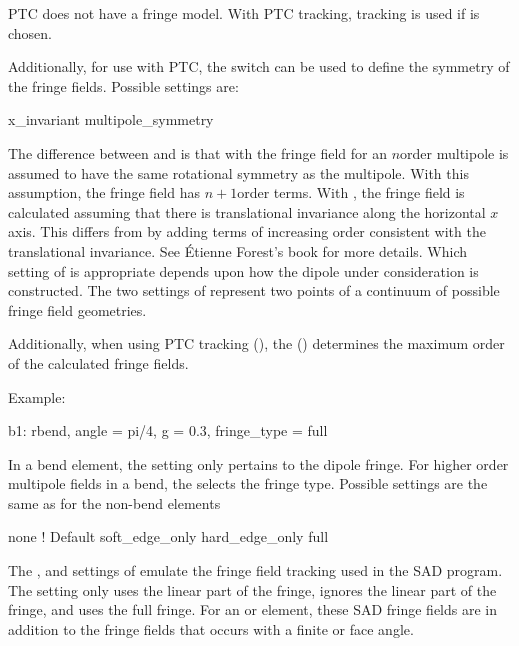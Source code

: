 {PTC does not have a  fringe model.
With PTC tracking,  tracking is used if  is chosen.

Additionally, for use with PTC, the  switch can be used
to define the symmetry of the fringe fields. Possible settings are:
\begin{example}
  x_invariant
  multipole_symmetry
\end{example}
The difference between  and  is that with
 the fringe field for an $n$\Th order multipole is assumed to have the same
rotational symmetry as the multipole. With this assumption, the fringe field has $n+1$\St order
terms.  With , the fringe field is calculated assuming that there is translational
invariance along the horizontal $x$ axis. This differs from  by adding terms
of increasing order consistent with the translational invariance. See \'Etienne Forest's
book\cite{b:forest} for more details. Which setting of  is appropriate
depends upon how the dipole under consideration is constructed. The two settings of
 represent two points of a continuum of possible fringe field geometries.

Additionally, when using PTC tracking (), the 
() determines the maximum order of the calculated fringe fields.

Example:
\begin{example}
  b1: rbend, angle = pi/4, g = 0.3, fringe_type = full
\end{example}

In a bend element, the  setting only pertains to the dipole fringe.  For higher
order multipole fields in a bend, the  selects the fringe
type. Possible settings are the same as for the non-bend  elements
\begin{example}
  none              ! Default 
  soft_edge_only
  hard_edge_only
  full
\end{example}

The ,  and  settings of  emulate
the fringe field tracking used in the SAD program\cite{b:sad}.  The  setting only
uses the linear part of the fringe,  ignores the linear part of the fringe, and
 uses the full fringe.  For an  or  element, these SAD fringe
fields are in addition to the fringe fields that occurs with a finite  or  face angle.

}
